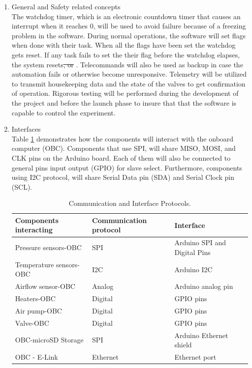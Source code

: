 \documentclass[a4paper,12pt,oneside]{article} %
\providecommand{\DIFaddtex}[1]{{\protect\color{blue}\uwave{#1}}} %
\providecommand{\DIFdeltex}[1]{{\protect\color{red}\sout{#1}}}                      %
\providecommand{\DIFaddbegin}{} %
\providecommand{\DIFaddend}{} %
\providecommand{\DIFdelbegin}{} %
\providecommand{\DIFdelend}{} %
\providecommand{\DIFadd}[1]{\texorpdfstring{\DIFaddtex{#1}}{#1}} %
\providecommand{\DIFdel}[1]{\texorpdfstring{\DIFdeltex{#1}}{}} %
\newcommand{\DIFscaledelfig}{0.5}
\newlength{\DIFdelgraphicswidth} %
\newlength{\DIFdelgraphicsheight} %
\newcommand{\DIFaddincludegraphics}[2][]{{\color{blue}\fbox{\DIFOincludegraphics[#1]{#2}}}} %
\newcommand{\DIFdelincludegraphics}[2][]{%
\sbox{\DIFdelgraphicsbox}{\DIFOincludegraphics[#1]{#2}}%
\settoboxwidth{\DIFdelgraphicswidth}{\DIFdelgraphicsbox} %
\settoboxtotalheight{\DIFdelgraphicsheight}{\DIFdelgraphicsbox} %
\scalebox{\DIFscaledelfig}{%
\parbox[b]{\DIFdelgraphicswidth}{\usebox{\DIFdelgraphicsbox}\\[-\baselineskip] \rule{\DIFdelgraphicswidth}{0em}}\llap{\resizebox{\DIFdelgraphicswidth}{\DIFdelgraphicsheight}{%
\setlength{\unitlength}{\DIFdelgraphicswidth}%
\begin{picture}(1,1)%
\thicklines\linethickness{2pt} %
{\color[rgb]{1,0,0}\put(0,0){\framebox(1,1){}}}%
{\color[rgb]{1,0,0}\put(0,0){\line( 1,1){1}}}%
{\color[rgb]{1,0,0}\put(0,1){\line(1,-1){1}}}%
\end{picture}%
}\hspace*{3pt}}} %
} %
\DeclareRobustCommand{\DIFaddbegin}{\DIFOaddbegin \let\includegraphics\DIFaddincludegraphics} %
\DeclareRobustCommand{\DIFaddend}{\DIFOaddend \let\includegraphics\DIFOincludegraphics} %
\DeclareRobustCommand{\DIFdelbegin}{\DIFOdelbegin \let\includegraphics\DIFdelincludegraphics} %
\DeclareRobustCommand{\DIFdelend}{\DIFOaddend \let\includegraphics\DIFOincludegraphics} %
\begin{document}
\begin{enumerate}[label=(\alph*)]
\item{General and Safety related concepts}\\
The watchdog timer, which is an electronic countdown timer that causes an interrupt when it reaches 0, will be used to avoid failure because of a \DIFaddbegin \DIFadd{possible }\DIFaddend freezing problem in the software. During normal operations, the software will set flags when done with their task. When all the flags have been set the watchdog gets reset. If any task fails to set the their flag before the watchdog elapses, the system resets\DIFdelbegin \DIFdel{, or }%
\DIFdelend . Telecommands will also be used as backup in case the automation fails or otherwise become unresponsive. Telemetry will be utilized to transmit housekeeping data and the state of the valves to get confirmation of operation. Rigorous testing will be performed during the development of the project and before the launch phase to insure that that the software is capable to control the experiment.
\item{Interfaces}\\
Table \ref{tab:comIntpro} demonstrates how the components will interact with the onboard computer (OBC). Components that use SPI, will share MISO, MOSI, and CLK pins on the Arduino board. Each of them will also be connected to general pins input output (GPIO) for slave select. Furthermore, components using I2C protocol, will share Serial Data pin (SDA) and Serial Clock pin (SCL).

\begin{table}[H]
\centering
\begin{tabular}{lll}
\textbf{Components interacting} & \textbf{Communication protocol} & \textbf{Interface}                 \\ \hline
Pressure sensors-OBC   & SPI                    & Arduino SPI and Digital Pins \\
Temperature sensors-OBC        & I2C                    & Arduino I2C \\
Airflow sensor-OBC     & Analog                    & Arduino analog pin \\
Heaters-OBC            & Digital                & GPIO pins \\
Air pump-OBC           & Digital                & GPIO pins \\
Valve-OBC              & Digital                & GPIO pins                 \\
OBC-microSD Storage    & SPI                    & Arduino Ethernet shield   \\
OBC - E-Link           & Ethernet               & Ethernet port            
\end{tabular}%
\caption{Communication and Interface Protocols.}
\label{tab:comIntpro}
\end{table}


\end{enumerate}
\end{document}
